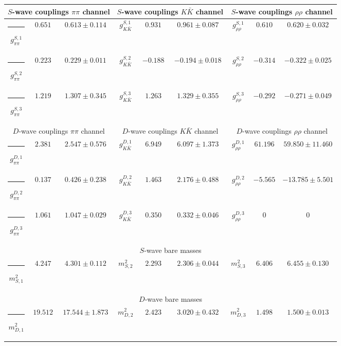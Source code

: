 \begin{table}[h]
\begin{ruledtabular}
\begin{tabular}{c c c c c c c c c}
\multicolumn{3}{c}{$S$-wave couplings $\pi \pi$ channel}  & \multicolumn{3}{c}{$S$-wave couplings $K  \bar K$ channel} & \multicolumn{3}{c}{$S$-wave couplings $\rho\rho$ channel} \\ \hline
\rule[-0.2cm]{-0.1cm}{.55cm} $g^{S,1}_{\pi\pi}$ & $0.651$ & $0.613 \pm 0.114$ & $g^{S,1}_{K\bar K}$ & $0.931$ & $0.961 \pm 0.087$ & $g^{S,1}_{\rho\rho}$ & $0.610$ & $0.620 \pm 0.032$ \\
\rule[-0.2cm]{-0.1cm}{.55cm} $g^{S,2}_{\pi\pi}$ & $0.223$ & $0.229 \pm 0.011$ & $g^{S,2}_{K\bar K}$ & $-0.188$ & $-0.194 \pm 0.018$ & $g^{S,2}_{\rho\rho}$ & $-0.314$ & $-0.322 \pm 0.025$ \\
\rule[-0.2cm]{-0.1cm}{.55cm} $g^{S,3}_{\pi\pi}$ & $1.219$ & $1.307 \pm 0.345$ & $g^{S,3}_{K\bar K}$ & $1.263$ & $1.329 \pm 0.355$ & $g^{S,3}_{\rho\rho}$ & $-0.292$ & $-0.271 \pm 0.049$ \\
\hline 
\multicolumn{3}{c}{$D$-wave couplings $\pi \pi$ channel}  & \multicolumn{3}{c}{$D$-wave couplings $K  \bar K$ channel} & \multicolumn{3}{c}{$D$-wave couplings $\rho\rho$ channel} \\ \hline
\rule[-0.2cm]{-0.1cm}{.55cm} $g^{D,1}_{\pi\pi}$ & $2.381$ & $2.547 \pm 0.576$ & $g^{D,1}_{K\bar K}$ & $6.949$ & $6.097 \pm 1.373$ & $g^{D,1}_{\rho\rho}$ & $61.196$ & $59.850 \pm 11.460$ \\
\rule[-0.2cm]{-0.1cm}{.55cm} $g^{D,2}_{\pi\pi}$ & $0.137$ & $0.426 \pm 0.238$ & $g^{D,2}_{K\bar K}$ & $1.463$ & $2.176 \pm 0.488$ & $g^{D,2}_{\rho\rho}$ & $-5.565$ & $-13.785 \pm 5.501$ \\
\rule[-0.2cm]{-0.1cm}{.55cm} $g^{D,3}_{\pi\pi}$ & $1.061$ & $1.047 \pm 0.029$ & $g^{D,3}_{K\bar K}$ & $0.350$ & $0.332 \pm 0.046$ & $g^{D,3}_{\rho\rho}$ & $0$ & $0$ \\
\hline 
\multicolumn{9}{c}{$S$-wave bare masses}   \\ \hline
\rule[-0.2cm]{-0.1cm}{.55cm} $m^2_{S,1}$ & $4.247$ & $4.301 \pm 0.112$ & $m^2_{S,2}$ & $2.293$ & $2.306 \pm 0.044$ & $m^2_{S,3}$ & $6.406$ & $6.455 \pm 0.130$ \\
\hline 
\multicolumn{9}{c}{$D$-wave bare masses}   \\ \hline
\rule[-0.2cm]{-0.1cm}{.55cm} $m^2_{D,1}$ & $19.512$ & $17.544 \pm 1.873$ & $m^2_{D,2}$ & $2.423$ & $3.020 \pm 0.432$ & $m^2_{D,3}$ & $1.498$ & $1.500 \pm 0.013$ \\

\end{tabular}
\end{ruledtabular}
\end{table}
